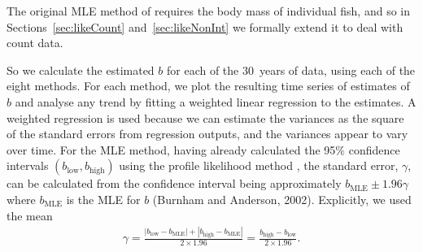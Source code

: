 \documentclass[12pt, letter]{article}
\newcommand{\eb}{\begin{eqnarray}}
\newcommand{\ee}{\end{eqnarray}}
\newcommand{\MEE}{erpbb17}     %
\begin{document}
The original MLE method of \citet{\MEE} requires the
body mass of individual fish, and so in Sections~\ref{sec:likeCount}
and~\ref{sec:likeNonInt}
we formally extend it to deal with count data.

So we calculate the estimated $b$ for each of the 30~years of data, using each
of the eight methods. For each method, we plot the resulting time series of
estimates of $b$ and analyse any trend by fitting a weighted linear regression
to the estimates. A weighted regression is used because we can estimate the
variances as the square of the standard errors from regression outputs, and the
variances appear to vary over time. For the MLE method, having already
calculated the 95\% confidence intervals $(b_{\text{low}}, b_{\text{high}})$
using the profile likelihood method
\cite{hm97}, the standard error, $\gamma$, can be calculated from the
confidence interval being approximately $b_{\text{MLE}} \pm 1.96 \gamma$ where
$b_{\text{MLE}}$ is the MLE for $b$ (Burnham and Anderson, 2002).
Explicitly, we used the mean
\eb
\gamma = \frac{ |b_{\text{low}} - b_{\text{MLE}} | +
  |b_{\text{high}} - b_{\text{MLE}} | }{2 \times 1.96}
  = \frac{ b_{\text{high}} - b_{\text{low}} }{2 \times 1.96}.
\ee
\end{document}
